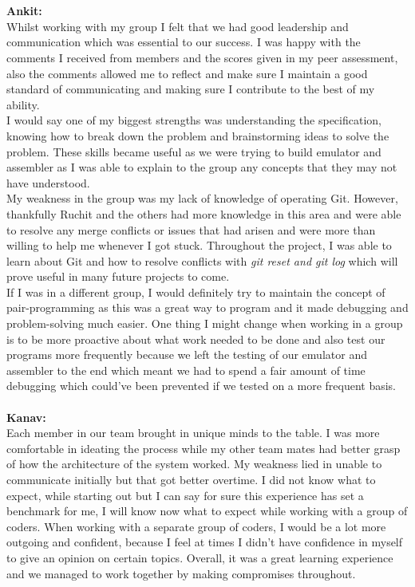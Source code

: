 \documentclass[a4paper]{article}
\begin{document}
\\\\
\textbf{Ankit:}\\
Whilst working with my group I felt that we had good leadership and communication which was essential to our success. I was happy with the comments I received from members and the scores given in my peer assessment, also the comments allowed me to reflect and make sure I maintain a good standard of communicating and making sure I contribute to the best of my ability. \\
I would say one of my biggest strengths was understanding the specification, knowing how to break down the problem and brainstorming ideas to solve the problem. These skills became useful as we were trying to build emulator and assembler as I was able to explain to the group any concepts that they may not have understood. \\
My weakness in the group was my lack of knowledge of operating Git. However, thankfully Ruchit and the others had more knowledge in this area and were able to resolve any merge conflicts or issues that had arisen and were more than willing to help me whenever I got stuck. Throughout the project, I was able to learn about Git and how to resolve conflicts with \textit{git reset and git log} which will prove useful in many future projects to come. \\
If I was in a different group, I would definitely try to maintain the concept of pair-programming as this was a great way to program and it made debugging and problem-solving much easier. One thing I might change when working in a group is to be more proactive about what work needed to be done and also test our programs more frequently because we left the testing of our emulator and assembler to the end which meant we had to spend a fair amount of time debugging which could've been prevented if we tested on a more frequent basis. 
\\\\
\textbf{Kanav:}\\
Each member in our team brought in unique minds to the table. I was more comfortable in ideating the process while my other team mates had better grasp of how the architecture of the system worked. My weakness lied in unable to communicate initially but that got better overtime. I did not know what to expect, while starting out but I can say for sure this experience has set a benchmark for me, I will know now what to expect while working with a group of coders. When working with a separate group of coders, I would be a lot more outgoing and confident, because I feel at times I didn't have confidence in myself to give an opinion on certain topics. Overall, it was a great learning experience and we managed to work together by making compromises throughout.
\end{document}

